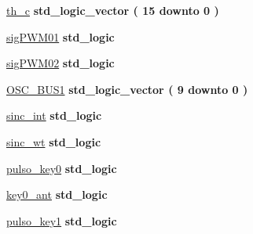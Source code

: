 \begin{DoxyCompactItemize}
\item 
\hyperlink{class_d_e0___n_a_n_o___v_f_1_1_m_a_i_n_ab8d8d0542e19badec5ebc4db01caa559}{th\+\_\+c} {\bfseries \textcolor{comment}{std\+\_\+logic\+\_\+vector}\textcolor{vhdlchar}{ }\textcolor{vhdlchar}{(}\textcolor{vhdlchar}{ }\textcolor{vhdlchar}{ } \textcolor{vhdldigit}{15} \textcolor{vhdlchar}{ }\textcolor{keywordflow}{downto}\textcolor{vhdlchar}{ }\textcolor{vhdlchar}{ } \textcolor{vhdldigit}{0} \textcolor{vhdlchar}{ }\textcolor{vhdlchar}{)}\textcolor{vhdlchar}{ }} 
\item 
\hyperlink{class_d_e0___n_a_n_o___v_f_1_1_m_a_i_n_a045072e209445fccb914305ca0eb2090}{sig\+P\+W\+M01} {\bfseries \textcolor{comment}{std\+\_\+logic}\textcolor{vhdlchar}{ }} 
\item 
\hyperlink{class_d_e0___n_a_n_o___v_f_1_1_m_a_i_n_a2121509d4c8f727f0995628fa5f7ab11}{sig\+P\+W\+M02} {\bfseries \textcolor{comment}{std\+\_\+logic}\textcolor{vhdlchar}{ }} 
\item 
\hyperlink{class_d_e0___n_a_n_o___v_f_1_1_m_a_i_n_a669c24d23c2e390b7703f7618cf959d8}{O\+S\+C\+\_\+\+B\+U\+S1} {\bfseries \textcolor{comment}{std\+\_\+logic\+\_\+vector}\textcolor{vhdlchar}{ }\textcolor{vhdlchar}{(}\textcolor{vhdlchar}{ }\textcolor{vhdlchar}{ } \textcolor{vhdldigit}{9} \textcolor{vhdlchar}{ }\textcolor{keywordflow}{downto}\textcolor{vhdlchar}{ }\textcolor{vhdlchar}{ } \textcolor{vhdldigit}{0} \textcolor{vhdlchar}{ }\textcolor{vhdlchar}{)}\textcolor{vhdlchar}{ }} 
\item 
\hyperlink{class_d_e0___n_a_n_o___v_f_1_1_m_a_i_n_a45126d1a75be347f440d181b7aa5e033}{sinc\+\_\+int} {\bfseries \textcolor{comment}{std\+\_\+logic}\textcolor{vhdlchar}{ }} 
\item 
\hyperlink{class_d_e0___n_a_n_o___v_f_1_1_m_a_i_n_ad0997d5afb9e2c2228ac89f0d9864320}{sinc\+\_\+wt} {\bfseries \textcolor{comment}{std\+\_\+logic}\textcolor{vhdlchar}{ }} 
\item 
\hyperlink{class_d_e0___n_a_n_o___v_f_1_1_m_a_i_n_a6eafaadc798c6f99d4bec39c9060e5f5}{pulso\+\_\+key0} {\bfseries \textcolor{comment}{std\+\_\+logic}\textcolor{vhdlchar}{ }} 
\item 
\hyperlink{class_d_e0___n_a_n_o___v_f_1_1_m_a_i_n_a6748feeda582b979ff293c4bf3ad340a}{key0\+\_\+ant} {\bfseries \textcolor{comment}{std\+\_\+logic}\textcolor{vhdlchar}{ }} 
\item 
\hyperlink{class_d_e0___n_a_n_o___v_f_1_1_m_a_i_n_a8707b12b53b6fd46834cc806fdace68f}{pulso\+\_\+key1} {\bfseries \textcolor{comment}{std\+\_\+logic}\textcolor{vhdlchar}{ }} 
\item 

\end{DoxyCompactItemize}
